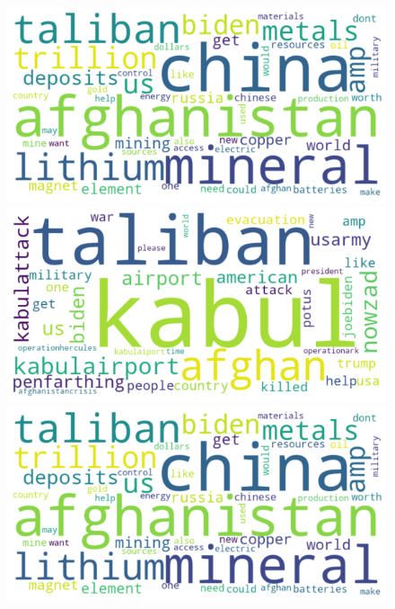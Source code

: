 \documentclass[12pt,%
               a4paper,%
               oneside,openany,%
               titlepage,%
               headinclude,footinclude,%
               BCOR5mm,%
               cleardoublepage=empty,%
               tablecaptionabove,%
               floatperchapter,
               ]{scrreprt}                 %
\begin{document}
\begin{figure}[ht]
\begin{minipage}[b]{0.5\linewidth}
 \centering
 \includegraphics[width=.9\linewidth]{Figures/WordCloud_Rareearth.png}
 \vspace{4ex}
\end{minipage}
  \begin{minipage}[b]{0.5\linewidth}
    \centering
    \includegraphics[width=.9\linewidth]{Figures/WordCloud_Afghanistan.png}
    \vspace{4ex}
  \end{minipage}%
   \begin{minipage}[b]{0.5\linewidth}
    \centering
    \includegraphics[width=.9\linewidth]{Figures/WordCloud_Rareearth.png} 

\end{minipage}
\end{figure}
\end{document}
